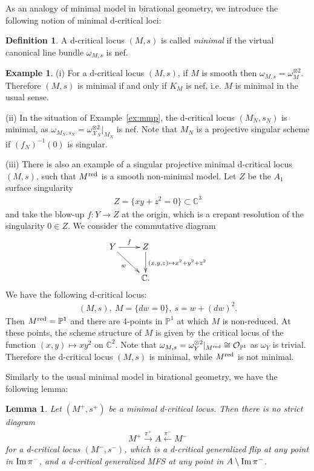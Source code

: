 \documentclass[11pt]{amsart}
\theoremstyle{plain}
\newtheorem{lem}[thm]{Lemma}
\theoremstyle{definition}
\newtheorem{defi}[thm]{Definition}
\newtheorem{exam}[thm]{Example}
\theoremstyle{remark}
\newcommand{\oO}{\mathcal{O}}
\newcommand{\xX}{\mathcal{X}}
\newcommand{\Imm}{\mathop{\rm Im}\nolimits}
\begin{document}
As an analogy of minimal model in birational 
geometry, we introduce the following notion of 
minimal d-critical loci: 
\begin{defi}\label{defi:minimal}
A d-critical locus $(M,s)$
is called \textit{minimal } if 
the virtual canonical line bundle 
$\omega_{M, s}$ is nef. 
\end{defi}
\begin{exam}\label{exam:minimal}
(i)
For a d-critical locus $(M, s)$, if 
$M$ is smooth then 
$\omega_{M, s}=\omega_M^{\otimes 2}$. Therefore 
$(M, s)$ is minimal if and only if $K_M$ is nef, i.e. 
$M$ is minimal in the usual sense. 

(ii) In the situation of Example~\ref{ex:mmp}, 
the d-critical locus $(M_N, s_N)$ is minimal, 
as $\omega_{M_N, s_N}=\omega_{\xX_N}^{\otimes 2}|_{M_N}$ is nef. 
Note that $M_N$ is a projective singular scheme if 
$(f_N)^{-1}(0)$ is singular. 


(iii) There is also an example of a singular 
projective minimal d-critical locus $(M, s)$, 
such that $M^{\rm{red}}$ is a smooth non-minimal model. 
Let $Z$ be the $A_1$ surface singularity 
\begin{align*}
Z=\{xy+z^2=0\} \subset \mathbb{C}^3
\end{align*}
and take the blow-up 
$f \colon Y \to Z$ at the origin, which is a 
crepant resolution of the singularity $0 \in Z$. 
We consider the commutative diagram
\begin{align*}
\xymatrix{
Y \ar[r]^-{f} \ar[dr]_-{w} & Z \ar[d]^{(x, y, z) \mapsto x^2+y^2+z^2} \\
&  \mathbb{C}.
}
\end{align*}
We have the following d-critical locus: 
\begin{align*}
(M, s), \ 
M=\{dw=0\}, \ s=w+(dw)^2.
\end{align*}
Then $M^{\rm{red}}=\mathbb{P}^1$ and 
there are 4-points in $\mathbb{P}^1$ at which 
$M$ is non-reduced. At these points, the 
scheme structure of $M$ is given by the critical 
locus of the function $(x, y) \mapsto xy^2$
on $\mathbb{C}^2$. Note that 
$\omega_{M, s}=\omega_Y^{\otimes 2}|_{M^{\rm{red}}} \cong \oO_{\mathbb{P}^1}$
as $\omega_Y$ is trivial. Therefore the d-critical locus
$(M, s)$ is minimal, while $M^{\rm{red}}$ is not minimal. 
\end{exam}
Similarly to the usual minimal model in 
birational geometry, we have the following lemma: 
\begin{lem}\label{lem:minimal}
Let $(M^+, s^+)$ be a minimal 
d-critical locus. 
Then there is no strict diagram
\begin{align}\label{dia:minimal}
M^+ \stackrel{\pi^+}{\to} A  \stackrel{\pi^-}{\leftarrow} M^-
\end{align}
for a d-critical locus $(M^-, s^-)$, 
which is a d-critical generalized flip 
at any point in $\Imm \pi^-$, and
a d-critical generalized MFS at any 
point in $A\setminus \Imm \pi^-$.
\end{lem}
\end{document}
